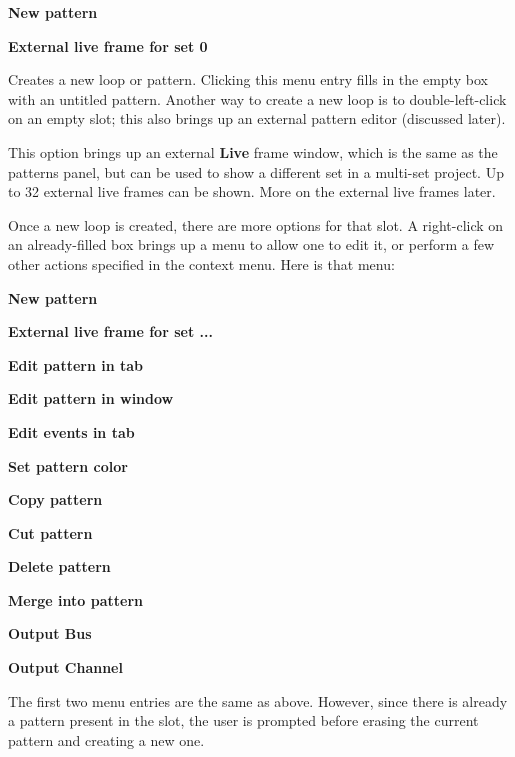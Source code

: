    \begin{enumber}
      \item \textbf{New pattern}
      \item \textbf{External live frame for set 0}
   \end{enumber}

   \setcounter{ItemCounter}{0}      %

   Creates a new loop or pattern.
   Clicking this menu entry fills in the empty box with an untitled
   pattern.  Another way to create a new loop is to double-left-click on an
   empty slot; this also brings up an external pattern editor (discussed
   later).

   This option brings up an external \textbf{Live} frame window, which
   is the same as the patterns panel, but can be used to show a different set
   in a multi-set project.  Up to 32 external live frames can be shown.
   More on the external live frames later.

   Once a new loop is created, there are more options for that slot.
   A right-click on an already-filled box brings up a menu
   to allow one to edit it, or perform a few other actions
   specified in the context menu.  Here is that menu:

   \begin{enumber}
      \item \textbf{New pattern}
      \item \textbf{External live frame for set ...}
      \item \textbf{Edit pattern in tab}
      \item \textbf{Edit pattern in window}
      \item \textbf{Edit events in tab}
      \item \textbf{Set pattern color}
      \item \textbf{Copy pattern}
      \item \textbf{Cut pattern}
      \item \textbf{Delete pattern}
      \item \textbf{Merge into pattern}
      \item \textbf{Output Bus}
      \item \textbf{Output Channel}
   \end{enumber}

   The first two menu entries are the same as above.  However, since there is
   already a pattern present in the slot, the user is prompted before erasing
   the current pattern and creating a new one.

